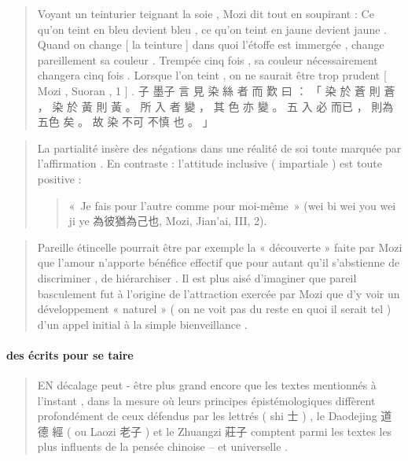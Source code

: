 \begin{quote}
\end{quote}  \begin{quote}

Voyant un teinturier teignant la soie , Mozi dit tout en soupirant : Ce
qu'on teint en bleu devient bleu , ce qu'on teint en jaune devient jaune
. Quand on change {[} la teinture {]} dans quoi l'étoffe est immergée ,
change pareillement sa couleur . Trempée cinq fois , sa couleur
nécessairement changera cinq fois . Lorsque l'on teint , on ne saurait
être trop prudent {[} Mozi , Suoran , 1 {]} . 子 墨子 言 見 染 絲 者 而
歎 曰 ： 「 染 於 蒼 則 蒼 ， 染 於 黃 則 黃 。 所 入 者 變 ， 其 色 亦
變 。 五 入 必 而已 ， 則為 五色 矣 。 故 染 不可 不慎 也 。 」

\end{quote}  \begin{quote}

La partialité insère des négations dans une réalité de soi toute marquée
par l'affirmation . En contraste : l'attitude inclusive ( impartiale )
est toute positive :
\begin{quote}
    « Je fais pour l’autre comme pour moi-même » (wei bi wei you wei ji ye 為彼猶為己也, Mozi, Jian’ai, III, 2).
 
\end{quote}
\end{quote}  \begin{quote}

Pareille étincelle pourrait être par exemple la « découverte » faite par
Mozi que l'amour n'apporte bénéfice effectif que pour autant qu'il
s'abstienne de discriminer , de hiérarchiser . Il est plus aisé
d'imaginer que pareil basculement fut à l'origine de l'attraction
exercée par Mozi que d'y voir un développement « naturel » ( on ne voit
pas du reste en quoi il serait tel ) d'un appel initial à la simple
bienveillance .

\end{quote} 
\paragraph{des écrits pour se taire}
 \begin{quote}

EN décalage peut - être plus grand encore que les textes mentionnés à
l'instant , dans la mesure où leurs principes épistémologiques diffèrent
profondément de ceux défendus par les lettrés ( shi 士 ) , le Daodejing
道德 經 ( ou Laozi 老子 ) et le Zhuangzi 莊子 comptent parmi les textes
les plus influents de la pensée chinoise -- et universelle .
\end{quote}